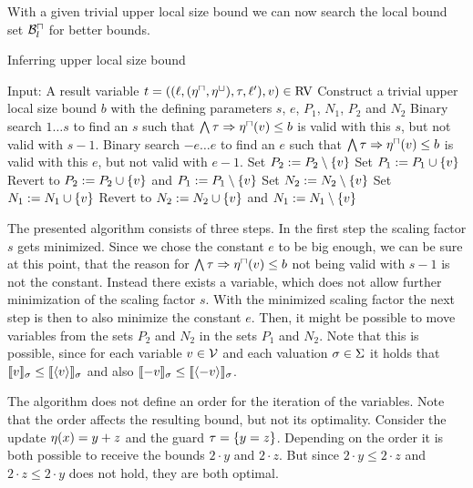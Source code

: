 With a given trivial upper local size bound we can now search the local bound set $\mathcal{B}^\sqcap_l$ for better bounds.

\begin{algorithm}
\caption{Inferring upper local size bound}\label{lsb_algorithm}
\begin{algorithmic}[1]
  \State Input: A result variable $t = ((\ell,(\eta^\sqcap,\eta^\sqcup),\tau,\ell'),v) \in \text{RV}$
  \State Construct a trivial upper local size bound $b$ with the defining parameters $s$, $e$, $P_1$, $N_1$, $P_2$ and $N_2$
  \State Binary search $1 \dots s$ to find an $s$ such that $\bigwedge \tau \Rightarrow \eta^\sqcap(v) \leq b$ is valid with this $s$, but not valid with $s-1$.
  \State Binary search $-e \dots e$ to find an $e$ such that $\bigwedge \tau \Rightarrow \eta^\sqcap(v) \leq b$ is valid with this $e$, but not valid with $e-1$.
    \State Set $P_2 := P_2 \setminus \lbrace v \rbrace$
      \State Set $P_1 := P_1 \cup \lbrace v \rbrace$
        \State Revert to $P_2 := P_2 \cup \lbrace v \rbrace$ and $P_1 := P_1 \setminus \lbrace v \rbrace$
      \EndIf
    \EndIf
    \State Set $N_2 := N_2 \setminus \lbrace v \rbrace$
      \State Set $N_1 := N_1 \cup \lbrace v \rbrace$
        \State Revert to $N_2 := N_2 \cup \lbrace v \rbrace$ and $N_1 := N_1 \setminus \lbrace v \rbrace$
      \EndIf
    \EndIf
  \EndFor
\end{algorithmic}
\end{algorithm}

The presented algorithm consists of three steps.
In the first step the scaling factor $s$ gets minimized.
Since we chose the constant $e$ to be big enough, we can be sure at this point, that the reason for $\bigwedge \tau \Rightarrow \eta^\sqcap(v) \leq b$ not being valid with $s-1$ is not the constant.
Instead there exists a variable, which does not allow further minimization of the scaling factor $s$.
With the minimized scaling factor the next step is then to also minimize the constant $e$.
Then, it might be possible to move variables from the sets $P_2$ and $N_2$ in the sets $P_1$ and $N_2$.
Note that this is possible, since for each variable $v \in \mathcal{V}$ and each valuation $\sigma \in \Sigma$ it holds that $\llbracket v \rrbracket_{\sigma} \leq \llbracket \langle v\rangle \rrbracket_{\sigma}$ and also $\llbracket -v \rrbracket_{\sigma} \leq \llbracket \langle-v\rangle \rrbracket_{\sigma}$.

The algorithm does not define an order for the iteration of the variables.
Note that the order affects the resulting bound, but not its optimality.
Consider the update $\eta(x) = y + z$ and the guard $\tau = \lbrace y = z \rbrace$.
Depending on the order it is both possible to receive the bounds $2 \cdot y$ and $2 \cdot z$.
But since $2 \cdot y \leq 2 \cdot z$ and $2 \cdot z \leq 2 \cdot y$ does not hold, they are both optimal.


